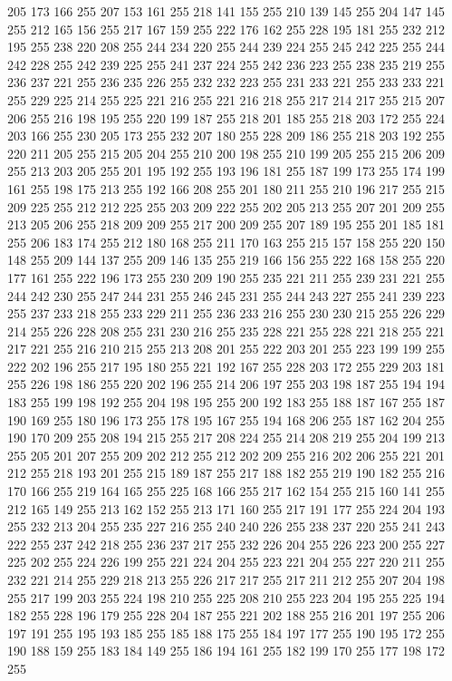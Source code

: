 205 173 166 255 207 153 161 255 218 141 155 255 210 139 145 255 204 147 145 255 212 165 156 255 217 167 159 255 222 176 162 255 228 195 181 255 232 212 195 255 238 220 208 255 244 234 220 255 244 239 224 255 245 242 225 255 244 242 228 255 242 239 225 255
241 237 224 255 242 236 223 255 238 235 219 255 236 237 221 255 236 235 226 255 232 232 223 255 231 233 221 255 233 233 221 255 229 225 214 255 225 221 216 255 221 216 218 255 217 214 217 255 215 207 206 255 216 198 195 255 220 199 187 255 218 201 185 255
218 203 172 255 224 203 166 255 230 205 173 255 232 207 180 255 228 209 186 255 218 203 192 255 220 211 205 255 215 205 204 255 210 200 198 255 210 199 205 255 215 206 209 255 213 203 205 255 201 195 192 255 193 196 181 255 187 199 173 255 174 199 161 255
198 175 213 255 192 166 208 255 201 180 211 255 210 196 217 255 215 209 225 255 212 212 225 255 203 209 222 255 202 205 213 255 207 201 209 255 213 205 206 255 218 209 209 255 217 200 209 255 207 189 195 255 201 185 181 255 206 183 174 255 212 180 168 255
211 170 163 255 215 157 158 255 220 150 148 255 209 144 137 255 209 146 135 255 219 166 156 255 222 168 158 255 220 177 161 255 222 196 173 255 230 209 190 255 235 221 211 255 239 231 221 255 244 242 230 255 247 244 231 255 246 245 231 255 244 243 227 255
241 239 223 255 237 233 218 255 233 229 211 255 236 233 216 255 230 230 215 255 226 229 214 255 226 228 208 255 231 230 216 255 235 228 221 255 228 221 218 255 221 217 221 255 216 210 215 255 213 208 201 255 222 203 201 255 223 199 199 255 222 202 196 255
217 195 180 255 221 192 167 255 228 203 172 255 229 203 181 255 226 198 186 255 220 202 196 255 214 206 197 255 203 198 187 255 194 194 183 255 199 198 192 255 204 198 195 255 200 192 183 255 188 187 167 255 187 190 169 255 180 196 173 255 178 195 167 255
194 168 206 255 187 162 204 255 190 170 209 255 208 194 215 255 217 208 224 255 214 208 219 255 204 199 213 255 205 201 207 255 209 202 212 255 212 202 209 255 216 202 206 255 221 201 212 255 218 193 201 255 215 189 187 255 217 188 182 255 219 190 182 255
216 170 166 255 219 164 165 255 225 168 166 255 217 162 154 255 215 160 141 255 212 165 149 255 213 162 152 255 213 171 160 255 217 191 177 255 224 204 193 255 232 213 204 255 235 227 216 255 240 240 226 255 238 237 220 255 241 243 222 255 237 242 218 255
236 237 217 255 232 226 204 255 226 223 200 255 227 225 202 255 224 226 199 255 221 224 204 255 223 221 204 255 227 220 211 255 232 221 214 255 229 218 213 255 226 217 217 255 217 211 212 255 207 204 198 255 217 199 203 255 224 198 210 255 225 208 210 255
223 204 195 255 225 194 182 255 228 196 179 255 228 204 187 255 221 202 188 255 216 201 197 255 206 197 191 255 195 193 185 255 185 188 175 255 184 197 177 255 190 195 172 255 190 188 159 255 183 184 149 255 186 194 161 255 182 199 170 255 177 198 172 255
